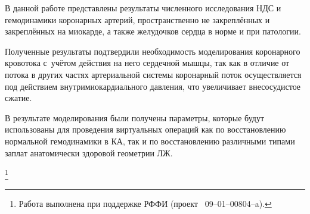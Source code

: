 \smallskip




В данной работе представлены результаты численного исследования  НДС и гемодинамики коронарных артерий, пространственно не закреплённых и закреплённых на миокарде, а также желудочков сердца в норме и при патологии. 



Полученные результаты подтвердили необходимость моделирования коронарного кровотока с~учётом действия на него сердечной мышцы, так как в отличие от потока в других частях артериальной системы коронарный поток осуществляется под действием внутримиокардиального давления, что увеличивает внесосудистое сжатие. 



В результате моделирования были получены параметры, которые будут использованы для проведения виртуальных операций как по восстановлению нормальной гемодинамики в КА, так и по восстановлению различными типами заплат анатомически здоровой геометрии ЛЖ. 



\thanks{Работа выполнена при поддержке РФФИ (проект \rm \No~09{--}01{--}00804{--}a).}



\newpage



